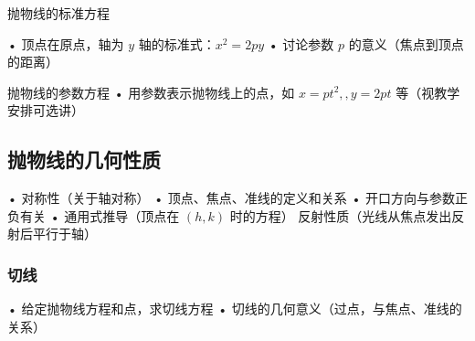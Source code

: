 \begin{theorem}{抛物线的标准方程}

\end{theorem}
	•	顶点在原点，轴为 $y$ 轴的标准式：$x^2=2py$
	•	讨论参数 $p$ 的意义（焦点到顶点的距离）
\begin{theorem}{抛物线的参数方程}
	•	用参数表示抛物线上的点，如 $x=pt^2,,y=2pt$ 等（视教学安排可选讲）
\end{theorem}

\subsection{抛物线的几何性质}
	•	对称性（关于轴对称）
	•	顶点、焦点、准线的定义和关系
	•	开口方向与参数正负有关
	•	通用式推导（顶点在 $(h,k)$ 时的方程）
    反射性质（光线从焦点发出反射后平行于轴）
\subsubsection{切线}
	•	给定抛物线方程和点，求切线方程
	•	切线的几何意义（过点，与焦点、准线的关系）
